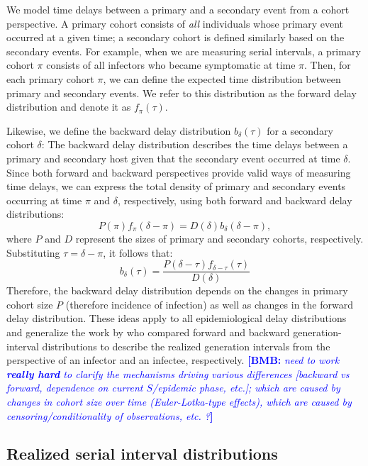 \documentclass[12pt]{article}
\newcommand{\comment}{\showcomment}
\newcommand{\showcomment}[3]{\textcolor{#1}{\textbf{[#2: }\textsl{#3}\textbf{]}}}
\newcommand{\bmb}[1]{\comment{blue}{BMB}{#1}}
\begin{document}
We model time delays between a primary and a secondary event from a cohort perspective.
A primary cohort consists of \emph{all} individuals whose primary event occurred at a given time; 
a secondary cohort is defined similarly based on the secondary events.
For example, when we are measuring serial intervals, a primary cohort $\pi$ consists of all infectors who became symptomatic at time $\pi$.
Then, for each primary cohort $\pi$, we can define the expected time distribution between primary and secondary events.
We refer to this distribution as the forward delay distribution and denote it as $f_\pi(\tau)$.

Likewise, we define the backward delay distribution $b_\delta(\tau)$ for a secondary cohort $\delta$:
The backward delay distribution describes the time delays between a primary and secondary host given that the secondary event occurred at time $\delta$.
Since both forward and backward perspectives provide valid ways of measuring time delays, we can express the total density of primary and secondary events occurring at time $\pi$ and $\delta$, respectively, using both forward and backward delay distributions:
\begin{equation}
P(\pi) f_\pi(\delta-\pi) = D(\delta) b_\delta(\delta-\pi),
\end{equation}
where $P$ and $D$ represent the sizes of primary and secondary cohorts, respectively.
Substituting $\tau = \delta - \pi$, it follows that:
\begin{equation}
b_\delta(\tau) = \frac{P(\delta-\tau) f_{\delta-\tau}(\tau)}{D(\delta)}
\end{equation}
Therefore, the backward delay distribution depends on the changes in primary cohort size $P$ (therefore incidence of infection) as well as changes in the forward delay distribution.
These ideas apply to all epidemiological delay distributions and generalize the work by \citep{champredon2015intrinsic} who compared forward and backward generation-interval distributions to describe the realized generation intervals from the perspective of an infector and an infectee, respectively.
\bmb{need to work \textbf{really hard} to clarify the mechanisms driving various differences [backward vs forward, dependence on current $S$/epidemic phase, etc.]; which are caused by changes in cohort size over time (Euler-Lotka-type effects), which are caused by censoring/conditionality of observations, etc. ?}

\subsection{Realized serial interval distributions}
\end{document}

